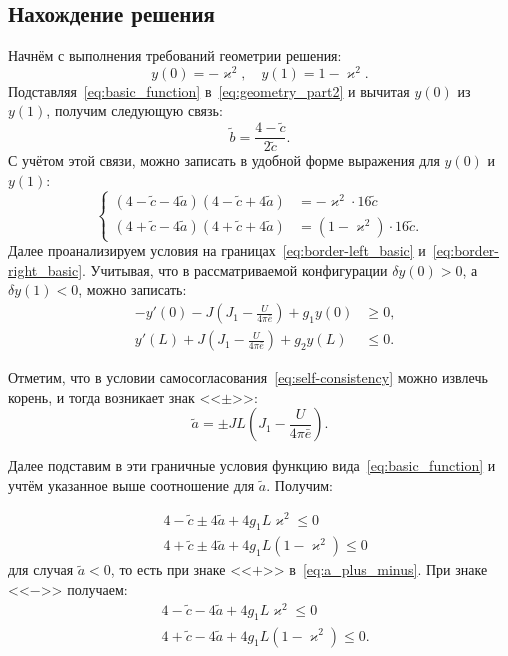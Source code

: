 \documentclass[a4paper, 12pt]{extarticle}
\def \vk {\varkappa}
\def \ta {\tilde{a}}
\def \tc {\tilde{c}}
\def \tb {\tilde{b}}
\begin{document}
\subsection{Нахождение решения}
Начнём с выполнения требований геометрии решения:
\begin{equation}\label{eq:geometry_part2}
y(0) = -\vk^2,\quad y(1) = 1-\vk^2.
\end{equation}
Подставляя~\eqref{eq:basic_function} в~\eqref{eq:geometry_part2} и вычитая $y(0)$ из $y(1)$, получим следующую связь:
\begin{equation}
	\tb = \frac{4-\tc}{2\tc}.\label{eq:some_connection}
\end{equation}
С учётом этой связи, можно записать в удобной форме выражения для $y(0)$ и $y(1)$:
\begin{equation}
	\left\{
	\begin{aligned}
		(4-\tc-4\ta)(4-\tc+4\ta) &= -\vk^2 \cdot 16\tc\\
		(4+\tc-4\ta)(4+\tc+4\ta) &= (1 - \vk^2)\cdot 16\tc.
	\end{aligned}
	\right.\label{eq:ch2_some_eq}
\end{equation}
Далее проанализируем условия на границах~\eqref{eq:border-left_basic} и~\eqref{eq:border-right_basic}.
Учитывая, что в рассматриваемой конфигурации $\delta y(0) > 0$, а $\delta y(1) < 0$, можно записать:
\begin{eqnarray}
	&-y'(0) - J\left(J_1 - \frac{U}{4\pi\bar{e}}\right) + g_1 y(0) &\geqslant 0,\\
	&y'(L) + J\left(J_1 - \frac{U}{4\pi\bar{e}}\right) + g_2 y(L) &\leqslant 0.
\end{eqnarray}

Отметим, что в условии самосогласования~\eqref{eq:self-consistency} можно извлечь корень, и тогда возникает знак <<$\pm$>>:
\begin{equation}\label{eq:a_plus_minus}
	\ta = \pm JL \left( J_1 - \frac{U}{4\pi\bar{e}} \right).	
\end{equation}

Далее подставим в эти граничные условия функцию вида~\eqref{eq:basic_function} и учтём указанное выше соотношение для $\ta$. Получим:

\begin{eqnarray}
	&4-\tc \pm 4\ta+4g_1L\vk^2\leqslant 0 \label{eq:Lborder_ready}\\
	&4+\tc \pm 4\ta + 4g_1L(1-\vk^2)\leqslant 0 \label{eq:Rborder_ready}
\end{eqnarray}
для случая $\ta < 0$, то есть при знаке <<$+$>> в~\eqref{eq:a_plus_minus}. При знаке <<$-$>> получаем:
\begin{eqnarray}
	&4 - \tc - 4\ta + 4g_1L\vk^2\leqslant 0\\
	&4 + \tc - 4\ta + 4g_1L(1-\vk^2)\leqslant 0.
\end{eqnarray}
\end{document}
